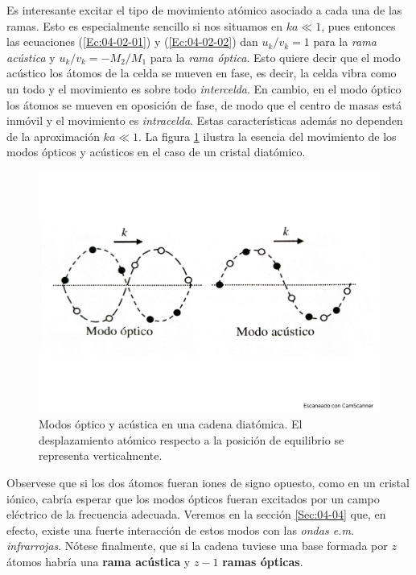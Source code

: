 Es interesante excitar el tipo de movimiento atómico asociado a cada una de las ramas. Esto es especialmente sencillo si nos situamos en $ka\ll 1$, pues entonces las ecuaciones (\ref{Ec:04-02-01}) y (\ref{Ec:04-02-02}) dan $u_k/v_k=1$ para la \textit{rama acústica} y $u_k/v_k = -M_2/M_1$ para la \textit{rama óptica}. Esto quiere decir que el modo acústico los átomos de la celda se mueven en fase, es decir, la celda vibra como un todo y el movimiento es sobre todo \textit{intercelda}. En cambio, en el modo óptico los átomos se mueven en oposición de fase, de modo que el centro de masas está inmóvil y el movimiento es \textit{intracelda}. Estas características además no dependen de la aproximación $ka\ll 1$. La figura \ref{Fig:04-06} ilustra la esencia del movimiento de los modos ópticos y acústicos en el caso de un cristal diatómico. 

\begin{figure}[h!] \centering
    \includegraphics[scale=0.37]{Cuerpo/Ch_04/Fotos libro 6.pdf}
    \caption{Modos óptico y acústica en una cadena diatómica. El desplazamiento atómico respecto a la posición de equilibrio se representa verticalmente.}
    \label{Fig:04-06}
\end{figure}    

Observese que si los dos átomos fueran iones de signo opuesto, como en un cristal iónico, cabría esperar que los modos ópticos fueran excitados por un campo eléctrico de la frecuencia adecuada. Veremos en la sección \ref{Sec:04-04} que, en efecto, existe una fuerte interacción de estos modos con las \textit{ondas e.m. infrarrojas}. Nótese finalmente, que si la cadena tuviese una base formada por $z$ átomos habría una \textbf{rama acústica} y $z-1$ \textbf{ramas ópticas}.

